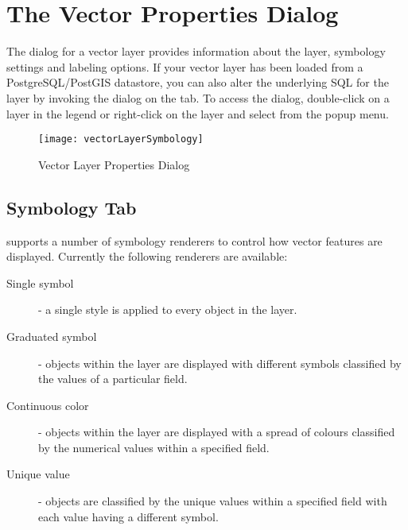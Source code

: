 \section{The Vector Properties Dialog}\label{sec:vectorprops}

The  dialog for a vector layer provides information
about the layer, symbology settings and labeling options. If your vector
layer has been loaded from a PostgreSQL/PostGIS datastore, you can also alter
the underlying SQL for the layer by invoking the 
dialog on the  tab.
To access the  dialog, double-click on a layer in
the legend or right-click on the layer and select 
from the popup menu.

\begin{figure}[ht]
   \centering
   \texttt{[image: vectorLayerSymbology]}
   \caption{Vector Layer Properties Dialog \nixcaption}\label{fig:vector_symbology}
 \end{figure}

\subsection{Symbology Tab}\label{sec:symbology}

\qg supports a number of symbology renderers to control how
vector features are displayed. Currently the following renderers
are available:

\begin{description}
    \item[Single symbol] - a single style is applied to every
    object in the layer.
    \item[Graduated symbol] - objects within the layer are
    displayed with different symbols classified by the values of a
    particular field.
    \item[Continuous color] - objects within the layer are
    displayed with a spread of colours classified by the numerical
    values within a specified field.
    \item[Unique value] - objects are classified by the unique
    values within a specified field with each value having a
    different symbol.
\end{description}

